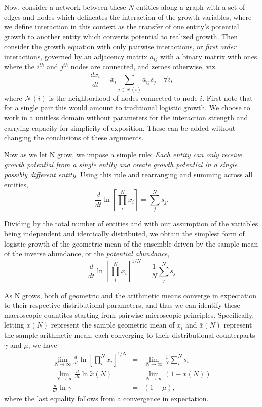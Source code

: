 \documentclass{article}
\begin{document}
Now, consider a network between these $N$ entities along a graph with a set of edges and nodes which delineates the interaction of the growth variables, where we define interaction in this context as the transfer of one entity's potential growth to another entity which converts potential to realized growth. Then consider the growth equation with only pairwise interactions, or \textit{first order} interactions, governed by an adjacency matrix ${a_{ij}}$ with a binary matrix with ones where the $i^{th}$ and $j^{th}$ nodes are connected, and zeroes otherwise, viz.
\begin{equation}
\label{eq:modSIR}
\frac{d x_i}{dt} = x_i\sum_{j \in \mathcal{N}(i)}{a_{ij}}s_{j} \quad \forall i,
\end{equation}
where $\mathcal{N}(i)$ is the neighborhood of nodes connected to node $i$.
First note that for a single pair this would amount to traditional logistic growth. We choose to work in a unitless domain without parameters for the interaction strength and carrying capacity for simplicity of exposition. These can be added without changing the conclusions of these arguments. 

Now as we let N grow, we impose a simple rule: \textit{Each entity can only receive growth potential from a single entity and create growth potential in a single possibly different entity}. Using this rule and rearranging and summing across all entities,
\begin{equation}
\label{eq:modSIR2}
\frac{d}{dt} \ln \left[ \prod_i^N x_i \right ] = \sum_j^N s_{j}.
\end{equation}

Dividing by the total number of entities and with our assumption of the variables being independent and identically distributed, we obtain the simplest form of logistic growth of the geometric mean of the ensemble driven by the sample mean of the inverse abundance, or the \textit{potential abundance}, 
\begin{equation}
\label{eq:modSIR3}
\frac{d}{dt} \ln \left[ \prod_i^N x_i \right ]^{1/N} = \frac{1}{N}\sum_j^N s_j 
\end{equation}

As N grows, both of geometric and the arithmetic means converge in expectation to their respective distributional parameters, and thus we can identify these macroscopic quantites starting from pairwise microscopic principles. Specifically, letting $\tilde{x}(N)$ represent the sample geometric mean of $x_i$ and $\bar{x}(N)$ represent the sample arithmetic mean, each converging to their distributional counterparts $\gamma$ and $\mu$, we have 
\begin{eqnarray*}
  \lim_{N\rightarrow \infty} \frac{d}{dt} \ln \left[ \prod_i^N x_i \right ]^{1/N} &=& \lim_{N\rightarrow \infty} \frac{1}{N}\sum_i^N s_i \\\
  \lim_{N\rightarrow \infty} \frac{d}{dt} \ln \tilde{x}(N) &=& \lim_{N\rightarrow \infty}(1 - \bar{x}(N)) \\
  \frac{d}{dt} \ln \gamma &=&(1 - \mu),
\end{eqnarray*}
where the last equality follows from a convergence in expectation.
\end{document}
